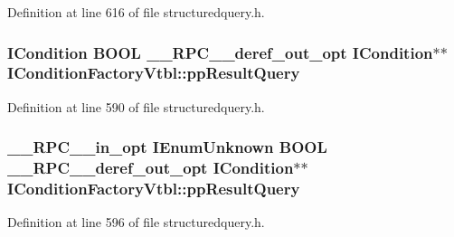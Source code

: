 Definition at line 616 of file structuredquery.\+h.

\subsubsection[{\texorpdfstring{pp\+Result\+Query}{ppResultQuery}}]{ {\bf I\+Condition} {\bf B\+O\+OL} {\bf \+\_\+\+\_\+\+R\+P\+C\+\_\+\+\_\+deref\+\_\+out\+\_\+opt} {\bf I\+Condition}$\ast$$\ast$ I\+Condition\+Factory\+Vtbl\+::pp\+Result\+Query}\hypertarget{struct_i_condition_factory_vtbl_aa1146445d38a978d13d440ea7f677222}{}\label{struct_i_condition_factory_vtbl_aa1146445d38a978d13d440ea7f677222}


Definition at line 590 of file structuredquery.\+h.

\subsubsection[{\texorpdfstring{pp\+Result\+Query}{ppResultQuery}}]{ {\bf \+\_\+\+\_\+\+R\+P\+C\+\_\+\+\_\+in\+\_\+opt} I\+Enum\+Unknown {\bf B\+O\+OL} {\bf \+\_\+\+\_\+\+R\+P\+C\+\_\+\+\_\+deref\+\_\+out\+\_\+opt} {\bf I\+Condition}$\ast$$\ast$ I\+Condition\+Factory\+Vtbl\+::pp\+Result\+Query}\hypertarget{struct_i_condition_factory_vtbl_a4b4b616bbbd1fa2105342947a3c8aa97}{}\label{struct_i_condition_factory_vtbl_a4b4b616bbbd1fa2105342947a3c8aa97}


Definition at line 596 of file structuredquery.\+h.

